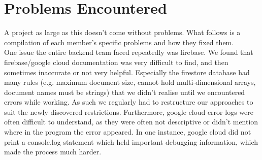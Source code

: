 \section{Problems Encountered}
A project as large as this doesn't come without problems. What follows is a compilation of each member's specific problems and how they fixed them. \\

One issue the entire backend team faced repeatedly was firebase. We found that firebase/google cloud documentation was very difficult to find, and then sometimes inaccurate or not very helpful.
Especially the firestore database had many rules (e.g. maximum document size, cannot hold multi-dimensional arrays, document names must be strings) that we didn't realise until we encountered errors while working. 
As such we regularly had to restructure our approaches to suit the newly discovered restrictions. 
Furthermore, google cloud error logs were often difficult to understand, as they were often not descriptive or didn't mention where in the program the error appeared. In one instance, google cloud did not print a console.log statement which held important debugging information, which made the process much harder.\\





